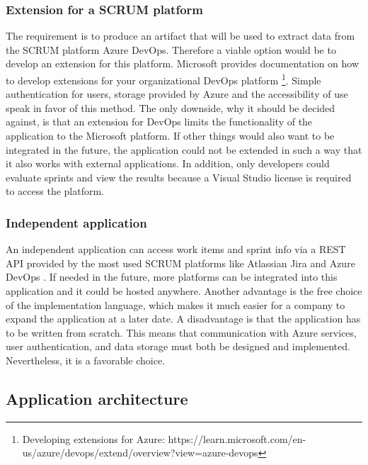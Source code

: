 \subsubsection{Extension for a SCRUM platform}
The requirement is to produce an artifact that will be used to extract 
data from the SCRUM platform Azure DevOps. 
Therefore a viable option would be to develop an extension for this platform.
Microsoft provides documentation on how to develop extensions for your 
organizational DevOps platform \footnote{Developing extensions for Azure: https://learn.microsoft.com/en-us/azure/devops/extend/overview?view=azure-devops}.
Simple authentication for users, storage provided by Azure and the 
accessibility of use speak in favor of this method.
The only downside, why it should be decided against, is that an extension for 
DevOps limits the functionality of the application to the Microsoft platform. 
If other things would also want to be integrated in the future, 
the application could not be extended in such a way that it 
also works with external applications. 
In addition, only developers could evaluate sprints and view the 
results because a Visual Studio license is required to access the platform.

\subsubsection{Independent application}
An independent application can access work items and sprint info via a REST API provided by the most used SCRUM platforms like Atlassian Jira and Azure DevOps \parencite{TopTenScrum}.
If needed in the future, more platforms can be integrated into this 
application and it could be hosted anywhere. 
Another advantage is the free choice of the implementation language, 
which makes it much easier for a company to expand the application at a later date. 
A disadvantage is that the application has to be written from scratch. 
This means that communication with Azure services, user authentication, 
and data storage must both be designed and implemented. 
Nevertheless, it is a favorable choice.

\subsection{Application architecture}

